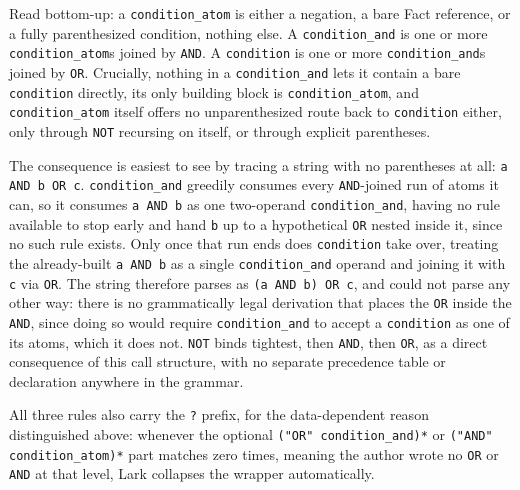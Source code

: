 Read bottom-up: a \lstinline|condition_atom| is either a negation, a bare Fact reference, or a fully parenthesized condition, nothing else. A \lstinline|condition_and| is one or more \lstinline|condition_atom|s joined by \lstinline|AND|. A \lstinline|condition| is one or more \lstinline|condition_and|s joined by \lstinline|OR|. Crucially, nothing in a \lstinline|condition_and| lets it contain a bare \lstinline|condition| directly, its only building block is \lstinline|condition_atom|, and \lstinline|condition_atom| itself offers no unparenthesized route back to \lstinline|condition| either, only through \lstinline|NOT| recursing on itself, or through explicit parentheses.


The consequence is easiest to see by tracing a string with no parentheses at all: \lstinline|a AND b OR c|. \lstinline|condition_and| greedily consumes every \lstinline|AND|-joined run of atoms it can, so it consumes \lstinline|a AND b| as one two-operand \lstinline|condition_and|, having no rule available to stop early and hand \lstinline|b| up to a hypothetical \lstinline|OR| nested inside it, since no such rule exists. Only once that run ends does \lstinline|condition| take over, treating the already-built \lstinline|a AND b| as a single \lstinline|condition_and| operand and joining it with \lstinline|c| via \lstinline|OR|. The string therefore parses as \lstinline|(a AND b) OR c|, and could not parse any other way: there is no grammatically legal derivation that places the \lstinline|OR| inside the \lstinline|AND|, since doing so would require \lstinline|condition_and| to accept a \lstinline|condition| as one of its atoms, which it does not. \lstinline|NOT| binds tightest, then \lstinline|AND|, then \lstinline|OR|, as a direct consequence of this call structure, with no separate precedence table or declaration anywhere in the grammar.

All three rules also carry the \lstinline|?| prefix, for the data-dependent reason distinguished above: whenever the optional \lstinline|("OR" condition_and)*| or \lstinline|("AND" condition_atom)*| part matches zero times, meaning the author wrote no \lstinline|OR| or \lstinline|AND| at that level, Lark collapses the wrapper automatically.

